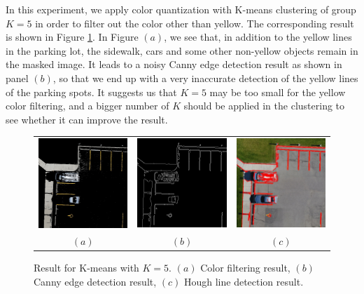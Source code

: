 \documentclass{m2pi}
\begin{document}
In this experiment, we apply color quantization with K-means clustering of 
group $K=5$ in order to filter out the color other than yellow. 
The corresponding result is shown in Figure 
\ref{lot1k5}. In Figure $(a)$, we see that, in addition to the 
yellow lines in the parking lot, the sidewalk, cars and some other non-yellow
objects remain in the masked image. It leads to a noisy Canny edge detection
result as shown in panel $(b)$, so that we end up with a very inaccurate detection
of the yellow lines of the parking spots. It suggests us that $K=5$ may be too
small for the yellow color filtering, and a bigger number of $K$ should 
be applied 
in the clustering to see whether it can improve the result.

\begin{figure}[htp]\label{parking_lot_9}
\centering
\begin{tabular}{ccc}
\includegraphics[width=3.8cm]{figures/Masked_Lot1k5.jpg}&
\includegraphics[width=3.8cm]{figures/Edge_Lot1k5.jpg}&
\includegraphics[width=3.8cm]{figures/Detected_Lot1k5.jpg}\\
$(a)$ & $(b)$ & $(c)$
\end{tabular}
\caption{Result for K-means with $K=5$. 
$(a)$ Color filtering result, 
$(b)$ Canny edge detection result,
$(c)$ Hough line detection result.}
\label{lot1k5}
\end{figure}
\end{document}
